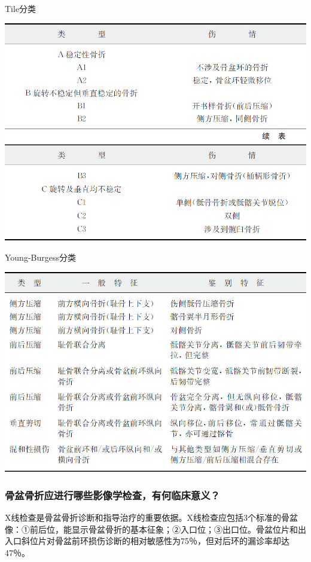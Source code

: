 \begin{table}[htbp]
\centering
\caption{Tile分类}
\label{tab18-6}
\includegraphics{./images/Image00146.jpg}
\includegraphics{./images/Image00147.jpg}
\end{table}

\begin{table}[htbp]
\centering
\caption{Young-Burgess分类}
\label{tab18-7}
\includegraphics{./images/Image00148.jpg}
\end{table}

\subsubsection{骨盆骨折应进行哪些影像学检查，有何临床意义？}

X线检查是骨盆骨折诊断和指导治疗的重要依据。X线检查应包括3个标准的骨盆像：①前后位，能显示骨盆骨折的基本征象；②入口位；③出口位。骨盆位片和出入口斜位片对骨盆前环损伤诊断的相对敏感性为75％，但对后环的漏诊率却达47％。

